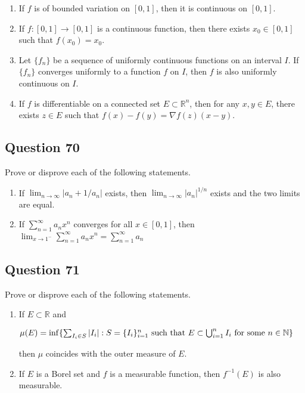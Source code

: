 \documentclass[12pt]{article}
\begin{document}
\begin{enumerate}
\def\labelenumi{(\alph{enumi})}
\item
  If \(f\) is of bounded variation on \([0,1]\), then it is continuous
  on \([0,1]\).
\item
  If \(f : [0, 1] \to [0, 1]\) is a continuous function, then there
  exists \(x_0 \in [0, 1]\) such that \(f(x_0) = x_0\).
\item
  Let \(\{f_n\}\) be a sequence of uniformly continuous functions on an
  interval \(I\). If \(\{f_n\}\) converges uniformly to a function \(f\)
  on \(I\), then \(f\) is also uniformly continuous on \(I\).
\item
  If \(f\) is differentiable on a connected set
  \(E \subset \mathbb{R}^n\), then for any \(x, y \in E\), there exists
  \(z \in E\) such that \(f(x) - f(y) = \nabla f(z)(x - y)\).
\end{enumerate}

\hypertarget{question-70-1}{%
\subsection{Question 70}\label{question-70-1}}

Prove or disprove each of the following statements.

\begin{enumerate}
\def\labelenumi{(\alph{enumi})}
\setcounter{enumi}{3}
\item
  If \(\lim_{n\to\infty} |a_n+1/a_n|\) exists, then
  \(\lim_{n\to \infty} |a_n|^{1/n}\) exists and the two limits are
  equal.
\item
  If \(\sum_{n=1}^\infty a_n x^n\) converges for all \(x \in [0, 1]\),
  then
  \(\lim_{x\to 1^-} \sum_{n=1}^\infty a_n x^n=\sum_{n=1}^\infty a_n\)
\end{enumerate}

\hypertarget{question-71-1}{%
\subsection{Question 71}\label{question-71-1}}

Prove or disprove each of the following statements.

\begin{enumerate}
\def\labelenumi{(\alph{enumi})}
\setcounter{enumi}{5}
\item
  If \(E \subset \mathbb{R}\) and

  \(\mu(E) = \inf\{\sum_{I_i \in S} |I_i| : S = \{I_i\}_{i=1}^n \text{ such that } E \subset \bigcup_{i=1}^n I_i \text{ for some } n \in \mathbb{N}\}\)

  then \(\mu\) coincides with the outer measure of \(E\).
\item
  If \(E\) is a Borel set and \(f\) is a measurable function, then
  \(f^{-1}(E)\) is also measurable.
\end{enumerate}
\end{document}
